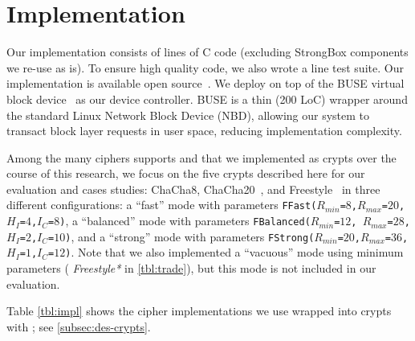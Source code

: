 \section{Implementation}\label{sec:impl}

Our \sys implementation consists of \locTotal lines of C code (excluding
StrongBox components we re-use as is). To ensure high quality code, we also
wrote a \locTest line test suite. Our implementation is available open
source~. We deploy \sys on top of the BUSE virtual block
device~\cite{BUSE} as our device controller. BUSE is a thin (200 LoC) wrapper
around the standard Linux Network Block Device (NBD), allowing our system to
transact block layer requests in user space, reducing implementation complexity.



Among the many ciphers \sys supports and that we implemented as crypts over the
course of this research, we focus on the five crypts described here for our
evaluation and cases studies: ChaCha8, ChaCha20~\cite{ChaCha20}, and
Freestyle~\cite{Freestyle} in three different configurations: a ``fast'' mode
with parameters
\texttt{FFast($R_{min}$=$8$,$R_{max}$=$20$,$H_I$=$4$,$I_C$=$8$)}, a ``balanced''
mode with parameters \texttt{FBalanced($R_{min}$=$12$,
$R_{max}$=$28$,$H_I$=$2$,$I_C$=$10$)}, and a ``strong'' mode with parameters
\texttt{FStrong($R_{min}$=$20$,$R_{max}$=$36$,$H_I$=$1$,$I_C$=$12$)}. Note that
we also implemented a ``vacuous'' mode using minimum parameters ({\em
Freestyle*} in \cref{tbl:trade}), but this mode is not included in our
evaluation.

Table \cref{tbl:impl} shows the cipher implementations we use wrapped into
crypts with \sysB; see \cref{subsec:des-crypts}.
